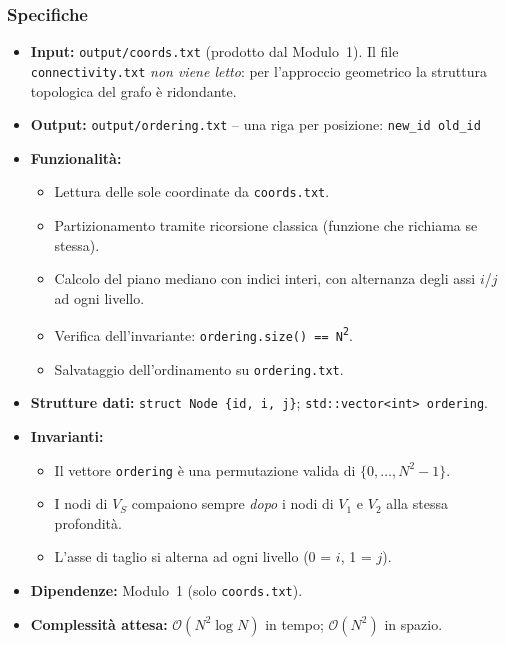 \documentclass[a4paper,12pt]{article}
\begin{document}
\subsubsection*{Specifiche}

\begin{itemize}
  \item \textbf{Input:} \texttt{output/coords.txt} (prodotto dal Modulo~1). Il file \texttt{connectivity.txt} \emph{non viene letto}: per l'approccio geometrico la struttura topologica del grafo è ridondante.
  \item \textbf{Output:} \texttt{output/ordering.txt} -- una riga per posizione: \texttt{new\_id old\_id}
  \item \textbf{Funzionalità:}
    \begin{itemize}
      \item Lettura delle sole coordinate da \texttt{coords.txt}.
      \item Partizionamento tramite ricorsione classica (funzione che richiama se stessa).
      \item Calcolo del piano mediano con indici interi, con alternanza degli assi $i$/$j$ ad ogni livello.
      \item Verifica dell'invariante: \texttt{ordering.size() == N\textsuperscript{2}}.
      \item Salvataggio dell'ordinamento su \texttt{ordering.txt}.
    \end{itemize}
  \item \textbf{Strutture dati:} \texttt{struct Node \{id, i, j\}}; \texttt{std::vector<int> ordering}.
  \item \textbf{Invarianti:}
    \begin{itemize}
      \item Il vettore \texttt{ordering} è una permutazione valida di $\{0, \dots, N^2-1\}$.
      \item I nodi di $V_S$ compaiono sempre \emph{dopo} i nodi di $V_1$ e $V_2$ alla stessa profondità.
      \item L'asse di taglio si alterna ad ogni livello (0 = $i$, 1 = $j$).
    \end{itemize}
  \item \textbf{Dipendenze:} Modulo~1 (solo \texttt{coords.txt}).
  \item \textbf{Complessità attesa:} $\mathcal{O}(N^2 \log N)$ in tempo; $\mathcal{O}(N^2)$ in spazio.
\end{itemize}
\end{document}
